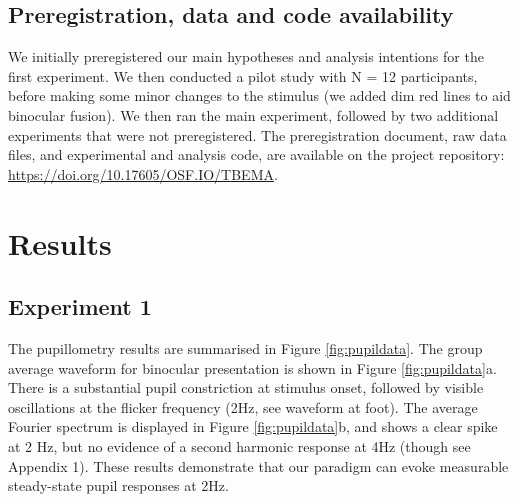 \documentclass[
]{article}
\begin{document}
\hypertarget{preregistration-data-and-code-availability}{%
\subsection{Preregistration, data and code availability}\label{preregistration-data-and-code-availability}}

We initially preregistered our main hypotheses and analysis intentions for the first experiment. We then conducted a pilot study with N = 12 participants, before making some minor changes to the stimulus (we added dim red lines to aid binocular fusion). We then ran the main experiment, followed by two additional experiments that were not preregistered. The preregistration document, raw data files, and experimental and analysis code, are available on the project repository: \url{https://doi.org/10.17605/OSF.IO/TBEMA}.

\hypertarget{results}{%
\section{Results}\label{results}}

\hypertarget{experiment-1}{%
\subsection{Experiment 1}\label{experiment-1}}

The pupillometry results are summarised in Figure \ref{fig:pupildata}. The group average waveform for binocular presentation is shown in Figure \ref{fig:pupildata}a. There is a substantial pupil constriction at stimulus onset, followed by visible oscillations at the flicker frequency (2Hz, see waveform at foot). The average Fourier spectrum is displayed in Figure \ref{fig:pupildata}b, and shows a clear spike at 2 Hz, but no evidence of a second harmonic response at 4Hz (though see Appendix 1). These results demonstrate that our paradigm can evoke measurable steady-state pupil responses at 2Hz.
\end{document}
